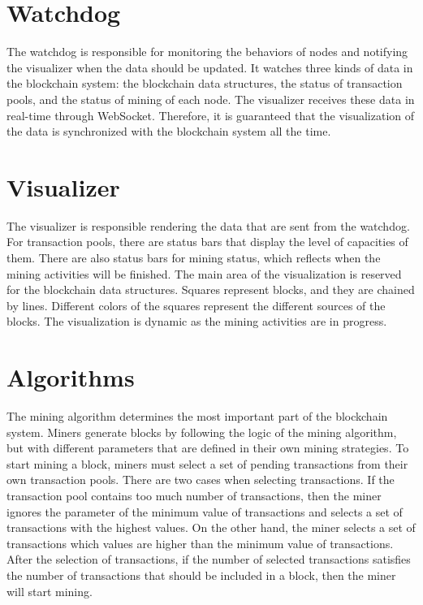\section{Watchdog}

The watchdog is responsible for monitoring the behaviors of nodes and notifying the visualizer when the data should be updated. It watches three kinds of data in the blockchain system: the blockchain data structures, the status of transaction pools, and the status of mining of each node. The visualizer receives these data in real-time through WebSocket. Therefore, it is guaranteed that the visualization of the data is synchronized with the blockchain system all the time.

\section{Visualizer}

The visualizer is responsible rendering the data that are sent from the watchdog. For transaction pools, there are status bars that display the level of capacities of them. There are also status bars for mining status, which reflects when the mining activities will be finished. The main area of the visualization is reserved for the blockchain data structures. Squares represent blocks, and they are chained by lines. Different colors of the squares represent the different sources of the blocks. The visualization is dynamic as the mining activities are in progress.

\section{Algorithms}
\label{algorithms}

The mining algorithm determines the most important part of the blockchain system. Miners generate blocks by following the logic of the mining algorithm, but with different parameters that are defined in their own mining strategies. To start mining a block, miners must select a set of pending transactions from their own transaction pools. There are two cases when selecting transactions. If the transaction pool contains too much number of transactions, then the miner ignores the parameter of the minimum value of transactions and selects a set of transactions with the highest values. On the other hand, the miner selects a set of transactions which values are higher than the minimum value of transactions. After the selection of transactions, if the number of selected transactions satisfies the number of transactions that should be included in a block, then the miner will start mining.

